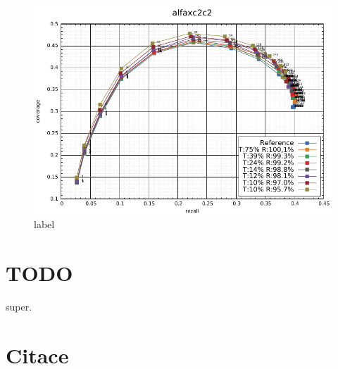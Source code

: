 \documentclass{article}
\begin{document}
\begin{landscape}
\begin{figure}
\includegraphics[width=1\textwidth]{1}
\caption{label}
\end{figure}
\end{landscape}


\section{TODO}
super. 


\section{Citace}
\printbibliography
\end{document}
